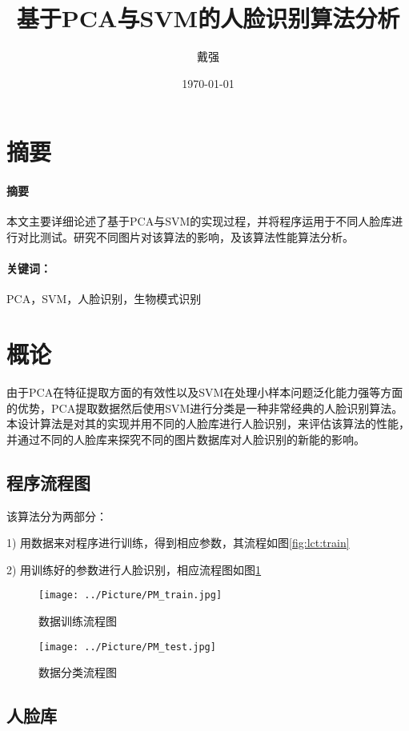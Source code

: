 \documentclass[a4paper,12pt]{ctexart}
\title{基于PCA与SVM的人脸识别算法分析}
\author{戴强}
\date{\today}
\renewenvironment*{abstract}[1]{%
\newcommand\gjc{#1}
\paragraph{摘要}
}{\paragraph{关键词：}\gjc }
\begin{document}
\maketitle

\newpage
\section{摘要}
\label{sec:zhaiyao}

\begin{abstract}{PCA，SVM，人脸识别，生物模式识别}
  本文主要详细论述了基于PCA与SVM的实现过程，并将程序运用于不同人脸库进行对比测试。研究不同图片对该算法的影响，及该算法性能算法分析。
\end{abstract}


\newpage


\tableofcontents

\newpage


\section{概论}
由于PCA在特征提取方面的有效性以及SVM在处理小样本问题泛化能力强等方面的优势，PCA提取数据然后使用SVM进行分类是一种非常经典的人脸识别算法。本设计算法是对其的实现并用不同的人脸库进行人脸识别，来评估该算法的性能，并通过不同的人脸库来探究不同的图片数据库对人脸识别的新能的影响。

\subsection{程序流程图}
该算法分为两部分：

1) 用数据来对程序进行训练，得到相应参数，其流程如图\ref{fig:lct:train}

2) 用训练好的参数进行人脸识别，相应流程图如图\ref{fig:lct:test}
\begin{figure}[htb]
\begin{minipage}[t]{0.5\linewidth}
\centering
\texttt{[image: ../Picture/PM\_train.jpg]}
\caption{数据训练流程图}
\label{fig:lct:train}
\end{minipage}%
\begin{minipage}[t]{0.5\linewidth}
\centering
\texttt{[image: ../Picture/PM\_test.jpg]}
\caption{数据分类流程图}
\label{fig:lct:test}
\end{minipage}
\end{figure}

\subsection{人脸库}
\end{document}
